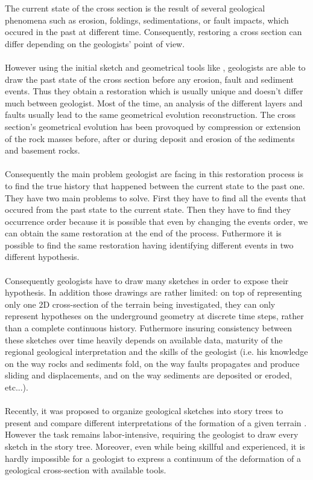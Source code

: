 \documentclass[12pt, a4paper]{report} %
\begin{document}
The current state of the cross section is the result of several geological phenomena such as erosion, foldings, sedimentations, or fault impacts, which occured in the past at different time. Consequently, restoring a cross section can differ depending on the geologists' point of view.\\\\
However using the initial sketch  and geometrical tools like \cite{Move}, geologists are able to draw the past state of the cross section before any erosion, fault and sediment events. Thus they obtain a restoration which is usually unique and doesn't differ much between geologist. 
Most of the time, an analysis of the different layers and faults usually lead to the same geometrical evolution reconstruction. The cross section's geometrical evolution has been provoqued by compression or extension of the rock masses before, after or during deposit and erosion of the sediments and basement rocks. \\\\
Consequently the main problem geologist are facing in this restoration process is to find the true history that happened between the current state to the past one. They have two main problems to solve. First they have to find all the events that occured from the past state to the current state. Then they have to find they occurrence order because it is possible that even by changing the events order, we can obtain the same restoration at the end of the process. Futhermore it is possible to find the same restoration having identifying different events in two different hypothesis. \\\\
Consequently geologists have to draw many sketches in order to expose their hypothesis. In addition those drawings are rather limited: on top of representing only one 2D cross-section of the terrain being investigated, they can only represent hypotheses on the underground geometry at discrete time steps, rather than a complete continuous history. Futhermore insuring consistency between these sketches over time heavily depends on available data, maturity of the regional geological interpretation and the skills of the geologist (i.e. his knowledge on the way rocks and sediments fold, on the way faults propagates and produce sliding and displacements, and on the way sediments are deposited or eroded, etc...).\\\\
Recently, it was proposed to organize geological sketches into story trees to present and compare different interpretations of the formation of a given terrain \cite{lidal}. However the task remains labor-intensive, requiring the geologist to draw every sketch in the story tree. Moreover, even while being skillful and experienced, it is hardly impossible for a geologist to express a continuum of the deformation of a geological cross-section with available tools.\\\\
\end{document}
